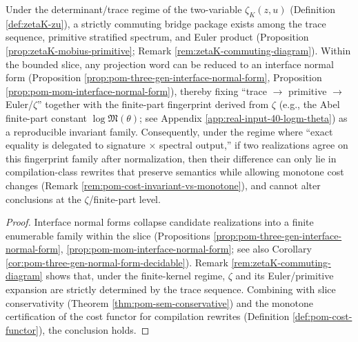 \begin{theorem}\label{thm:xi-zeta-interface-auditable-uniqueness}
Under the determinant/trace regime of the two-variable \(\zeta_K(z,u)\) (Definition \ref{def:zetaK-zu}), a strictly commuting bridge package exists among the trace sequence, primitive stratified spectrum, and Euler product (Proposition \ref{prop:zetaK-mobius-primitive}; Remark \ref{rem:zetaK-commuting-diagram}).
Within the bounded slice, any projection word can be reduced to an interface normal form (Proposition \ref{prop:pom-three-gen-interface-normal-form}, Proposition \ref{prop:pom-mom-interface-normal-form}), thereby fixing ``trace \(\to\) primitive \(\to\) Euler/\(\zeta\)'' together with the finite-part fingerprint derived from \(\zeta\) (e.g., the Abel finite-part constant \(\log\mathfrak{M}(\theta)\); see Appendix \ref{app:real-input-40-logm-theta}) as a reproducible invariant family.
Consequently, under the regime where ``exact equality is delegated to signature \(\times\) spectral output,'' if two realizations agree on this fingerprint family after normalization, then their difference can only lie in compilation-class rewrites that preserve semantics while allowing monotone cost changes (Remark \ref{rem:pom-cost-invariant-vs-monotone}), and cannot alter conclusions at the \(\zeta\)/finite-part level.
\end{theorem}

\begin{proof}
Interface normal forms collapse candidate realizations into a finite enumerable family within the slice (Propositions \ref{prop:pom-three-gen-interface-normal-form}, \ref{prop:pom-mom-interface-normal-form}; see also Corollary \ref{cor:pom-three-gen-normal-form-decidable}).
Remark \ref{rem:zetaK-commuting-diagram} shows that, under the finite-kernel regime, \(\zeta\) and its Euler/primitive expansion are strictly determined by the trace sequence.
Combining with slice conservativity (Theorem \ref{thm:pom-sem-conservative}) and the monotone certification of the cost functor for compilation rewrites (Definition \ref{def:pom-cost-functor}), the conclusion holds.
\end{proof}

